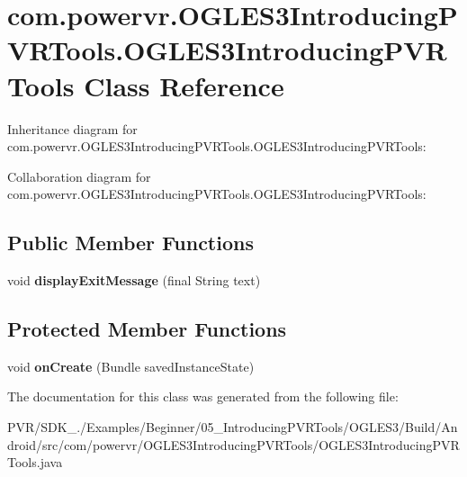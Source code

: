 \hypertarget{classcom_1_1powervr_1_1_o_g_l_e_s3_introducing_p_v_r_tools_1_1_o_g_l_e_s3_introducing_p_v_r_tools}{\section{com.\+powervr.\+O\+G\+L\+E\+S3\+Introducing\+P\+V\+R\+Tools.\+O\+G\+L\+E\+S3\+Introducing\+P\+V\+R\+Tools Class Reference}
\label{classcom_1_1powervr_1_1_o_g_l_e_s3_introducing_p_v_r_tools_1_1_o_g_l_e_s3_introducing_p_v_r_tools}
}


Inheritance diagram for com.\+powervr.\+O\+G\+L\+E\+S3\+Introducing\+P\+V\+R\+Tools.\+O\+G\+L\+E\+S3\+Introducing\+P\+V\+R\+Tools\+:


Collaboration diagram for com.\+powervr.\+O\+G\+L\+E\+S3\+Introducing\+P\+V\+R\+Tools.\+O\+G\+L\+E\+S3\+Introducing\+P\+V\+R\+Tools\+:
\subsection*{Public Member Functions}
\begin{DoxyCompactItemize}
\item 
\hypertarget{classcom_1_1powervr_1_1_o_g_l_e_s3_introducing_p_v_r_tools_1_1_o_g_l_e_s3_introducing_p_v_r_tools_aec0c2b94b9e27e177e6ce277cadcc712}{void {\bfseries display\+Exit\+Message} (final String text)}\label{classcom_1_1powervr_1_1_o_g_l_e_s3_introducing_p_v_r_tools_1_1_o_g_l_e_s3_introducing_p_v_r_tools_aec0c2b94b9e27e177e6ce277cadcc712}

\end{DoxyCompactItemize}
\subsection*{Protected Member Functions}
\begin{DoxyCompactItemize}
\item 
\hypertarget{classcom_1_1powervr_1_1_o_g_l_e_s3_introducing_p_v_r_tools_1_1_o_g_l_e_s3_introducing_p_v_r_tools_af54a22cb8af749e7f0bebea7a285bad1}{void {\bfseries on\+Create} (Bundle saved\+Instance\+State)}\label{classcom_1_1powervr_1_1_o_g_l_e_s3_introducing_p_v_r_tools_1_1_o_g_l_e_s3_introducing_p_v_r_tools_af54a22cb8af749e7f0bebea7a285bad1}

\end{DoxyCompactItemize}


The documentation for this class was generated from the following file\+:\begin{DoxyCompactItemize}
\item 
P\+V\+R/\+S\+D\+K\+\_./\+Examples/\+Beginner/05\+\_\+\+Introducing\+P\+V\+R\+Tools/\+O\+G\+L\+E\+S3/\+Build/\+Android/src/com/powervr/\+O\+G\+L\+E\+S3\+Introducing\+P\+V\+R\+Tools/O\+G\+L\+E\+S3\+Introducing\+P\+V\+R\+Tools.\+java\end{DoxyCompactItemize}
